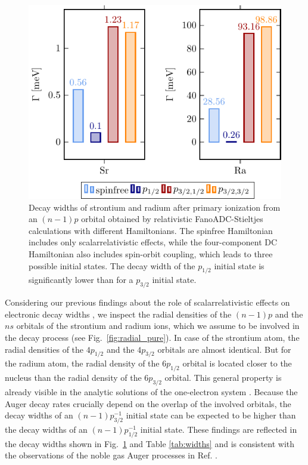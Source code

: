\begin{figure}[h]
 \centering
 \includegraphics[width=0.95\columnwidth]{pics/gamma_group.pdf}
 \caption{Decay widths of strontium and radium after primary ionization from
          an $(n-1)p$ orbital obtained by relativistic FanoADC-Stieltjes
          calculations with different Hamiltonians. The spinfree Hamiltonian
          includes only scalarrelativistic effects, while the four-component
          DC Hamiltonian also includes spin-orbit coupling, which leads to
          three possible initial states. The decay width of the $p_{1/2}$
          initial state is significantly lower than for a $p_{3/2}$ initial
          state.}
 \label{fig:gamma}
\end{figure}

Considering our previous findings about the role
of scalarrelativistic effects on electronic decay widths \cite{Fasshauer15_1},
we inspect the radial densities of the $(n-1)p$ and the $ns$ orbitals of the
strontium and radium ions,
which we assume to be involved in the decay process (see
Fig.~\ref{fig:radial_pure}).
In case of the strontium atom, the radial densities of the $4p_{1/2}$ and the
$4p_{3/2}$ orbitals are almost identical. But for the radium atom, the radial
density of the  $6p_{1/2}$ orbital is located closer to the nucleus than
the radial density of the $6p_{3/2}$ orbital. This general property is already
visible in the analytic solutions of the one-electron system \cite{Bethe_Salpeter}.
Because the Auger decay rates crucially depend on the overlap of the
involved orbitals, the decay widths of an $(n-1)p_{3/2}^{-1}$ initial state
can be expected to be higher than the decay widths of an $(n-1)p_{1/2}^{-1}$
initial state. These findings are reflected in the decay widths shown in
Fig.~\ref{fig:gamma} and Table \ref{tab:widths} and is consistent with the
observations of the noble gas Auger processes in Ref. \cite{Fasshauer15_1}.


